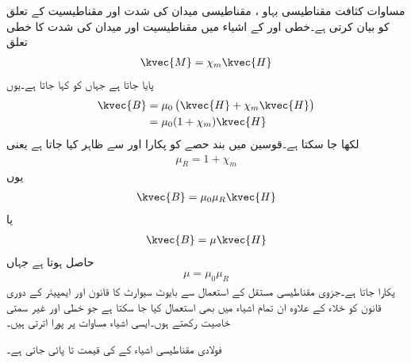 مساوات  کثافت مقناطیسی  بہاو ، مقناطیسی میدان کی شدت  اور مقناطیسیت  کے تعلق کو بیان کرتی ہے۔خطی اور  کے اشیاء  میں مقناطیسیت اور میدان کی شدت کا خطی تعلق
\begin{align}\label{مساوات_امالہ_خطی_ہم_سمتی_اشیاء_تعلق}
\kvec{M}=\chi_m \kvec{H}
\end{align}
پایا جاتا ہے  جہاں  کو  کہا جاتا ہے۔یوں
\begin{align*}
\kvec{B}&=\mu_0\left(\kvec{H}+\chi_m \kvec{H} \right)\\
&=\mu_0 (1+\chi_m)\kvec{H}
\end{align*}
لکھا جا سکتا ہے۔قوسین میں بند حصے کو  پکارا اور  سے ظاہر کیا جاتا ہے یعنی
\begin{align}
\mu_R=1+\chi_m
\end{align}
یوں
\begin{align*}
\kvec{B}=\mu_0 \mu_R \kvec{H}
\end{align*}
یا
\begin{align}
\kvec{B}=\mu \kvec{H}
\end{align}
حاصل ہوتا ہے جہاں 
\begin{align}
\mu=\mu_0 \mu_R
\end{align}
 پکارا جاتا ہے۔جزوی مقناطیسی مستقل  کے استعمال سے بایوٹ سیوارٹ کا قانون اور ایمپیئر کے دوری قانون کو خلاء کے علاوہ ان تمام اشیاء میں بھی استعمال کیا جا سکتا ہے جو خطی اور غیر سمتی خاصیت رکھتے ہوں۔ایسی اشیاء مساوات  پر پورا اترتی ہیں۔

فولادی مقناطیسی اشیاء کے  کی قیمت  تا  پائی جاتی ہے۔

